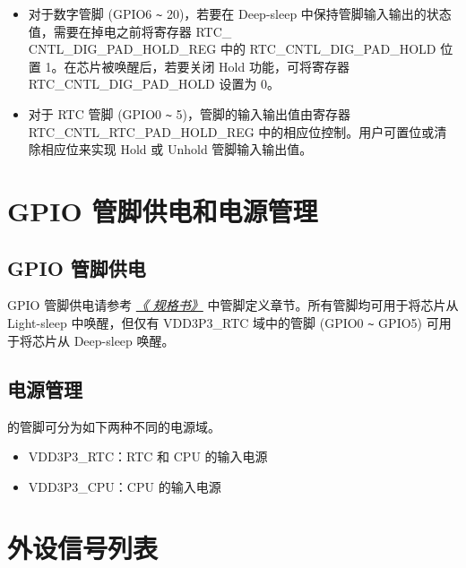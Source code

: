 \documentclass[main\_\_CN.tex]{subfiles}
\begin{document}
\begin{tiplisting}
\vspace{-2em}
\begin{itemize}
\item 对于数字管脚 (GPIO6 \verb+~+ 20)，若要在 Deep-sleep 中保持管脚输入输出的状态值，需要在掉电之前将寄存器 RTC\_\\CNTL\_DIG\_PAD\_HOLD\_REG 中的 RTC\_CNTL\_DIG\_PAD\_HOLD\regindex{[n]} 位置 1。在芯片被唤醒后，若要关闭 Hold 功能，可将寄存器 RTC\_CNTL\_DIG\_PAD\_HOLD\regindex{[n]} 设置为 0。

\item 对于 RTC 管脚 (GPIO0 \verb+~+ 5)，管脚的输入输出值由寄存器 RTC\_CNTL\_RTC\_PAD\_HOLD\_REG 中的相应位控制。用户可置位或清除相应位来实现 Hold 或 Unhold 管脚输入输出值。
\end{itemize}
\end{tiplisting}


\section{GPIO 管脚供电和电源管理}\label{I/O Pad Power Supplies}

\subsection{GPIO 管脚供电}
GPIO 管脚供电请参考  {\it{\href{https://www.espressif.com/sites/default/files/documentation/esp8684_datasheet_en.pdf}{《\chipname{} 规格书》}}} 中管脚定义章节。所有管脚均可用于将芯片从 Light-sleep 中唤醒，但仅有 VDD3P3\_RTC 域中的管脚 (GPIO0 \verb+~+ GPIO5) 可用于将芯片从 Deep-sleep 唤醒。

\subsection{电源管理}

\chipname{} 的管脚可分为如下两种不同的电源域。

\begin{itemize}
    \item VDD3P3\_RTC：RTC 和 CPU 的输入电源
    \item VDD3P3\_CPU：CPU 的输入电源
\end{itemize}

\section{外设信号列表}
\label{sec:peripheral_signals}
\end{document}
